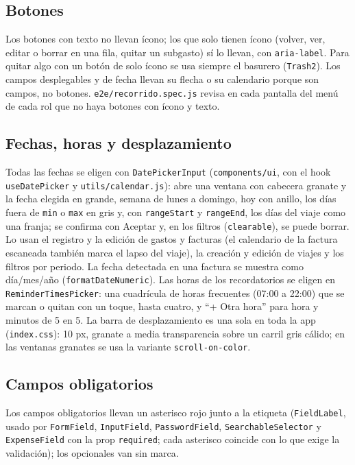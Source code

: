\documentclass[11pt,letterpaper]{article}
\newcommand{\code}[1]{\nolinkurl{#1}}
\begin{document}
\subsection{Botones}
Los botones con texto no llevan ícono; los que solo tienen ícono (volver, ver, editar o borrar en una fila, quitar un subgasto) sí lo llevan, con \code{aria-label}. Para quitar algo con un botón de solo ícono se usa siempre el basurero (\code{Trash2}). Los campos desplegables y de fecha llevan su flecha o su calendario porque son campos, no botones. \code{e2e/recorrido.spec.js} revisa en cada pantalla del menú de cada rol que no haya botones con ícono y texto.

\subsection{Fechas, horas y desplazamiento}
Todas las fechas se eligen con \code{DatePickerInput} (\code{components/ui}, con el hook \code{useDatePicker} y \code{utils/calendar.js}): abre una ventana con cabecera granate y la fecha elegida en grande, semana de lunes a domingo, hoy con anillo, los días fuera de \code{min} o \code{max} en gris y, con \code{rangeStart} y \code{rangeEnd}, los días del viaje como una franja; se confirma con Aceptar y, en los filtros (\code{clearable}), se puede borrar. Lo usan el registro y la edición de gastos y facturas (el calendario de la factura escaneada también marca el lapso del viaje), la creación y edición de viajes y los filtros por periodo. La fecha detectada en una factura se muestra como día/mes/año (\code{formatDateNumeric}). Las horas de los recordatorios se eligen en \code{ReminderTimesPicker}: una cuadrícula de horas frecuentes (07:00 a 22:00) que se marcan o quitan con un toque, hasta cuatro, y ``+ Otra hora'' para hora y minutos de 5 en 5. La barra de desplazamiento es una sola en toda la app (\code{index.css}): 10 px, granate a media transparencia sobre un carril gris cálido; en las ventanas granates se usa la variante \code{scroll-on-color}.

\subsection{Campos obligatorios}
Los campos obligatorios llevan un asterisco rojo junto a la etiqueta (\code{FieldLabel}, usado por \code{FormField}, \code{InputField}, \code{PasswordField}, \code{SearchableSelector} y \code{ExpenseField} con la prop \code{required}; cada asterisco coincide con lo que exige la validación); los opcionales van sin marca.
\end{document}
